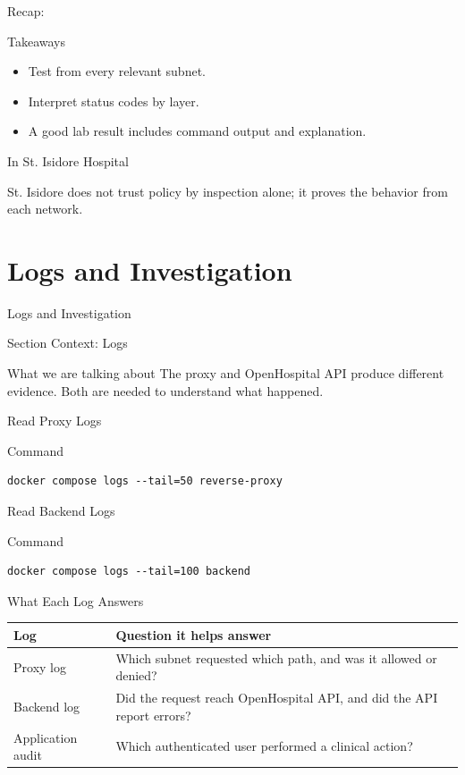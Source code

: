\documentclass[presentation]{beamer}
\newcommand{\sectiontitleframe}[1]{
\begin{frame}[plain,c]
\begin{center}
{\usebeamerfont{title}\usebeamercolor[fg]{title}#1}
\end{center}
\end{frame}
}
\newcommand{\scenario}{St. Isidore Hospital}
\newcommand{\takeawaysframe}[2]{
\begin{frame}[c]{Recap: \insertsection}
\begin{block}{Takeaways}
#1
\end{block}
\begin{exampleblock}{In \scenario}
#2
\end{exampleblock}
\end{frame}
}
\begin{document}
\takeawaysframe{
\begin{itemize}
    \item Test from every relevant subnet.
    \item Interpret status codes by layer.
    \item A good lab result includes command output and explanation.
\end{itemize}
}{
St. Isidore does not trust policy by inspection alone; it proves the behavior from each network.
}

\section{Logs and Investigation}
\sectiontitleframe{Logs and Investigation}

\begin{frame}[c]{Section Context: Logs}
\begin{block}{What we are talking about}
The proxy and OpenHospital API produce different evidence. Both are needed to understand what
happened.
\end{block}
\end{frame}

\begin{frame}[fragile,c]{Read Proxy Logs}
\begin{block}{Command}
\begin{verbatim}
docker compose logs --tail=50 reverse-proxy
\end{verbatim}
\end{block}
\end{frame}

\begin{frame}[fragile,c]{Read Backend Logs}
\begin{block}{Command}
\begin{verbatim}
docker compose logs --tail=100 backend
\end{verbatim}
\end{block}
\end{frame}

\begin{frame}[c]{What Each Log Answers}
\small
\begin{tabularx}{\textwidth}{@{}p{}X@{}}
\toprule
\textbf{Log} & \textbf{Question it helps answer} \\
\midrule
Proxy log & Which subnet requested which path, and was it allowed or denied? \\
Backend log & Did the request reach OpenHospital API, and did the API report errors? \\
Application audit & Which authenticated user performed a clinical action? \\
\bottomrule
\end{tabularx}
\end{frame}
\end{document}
